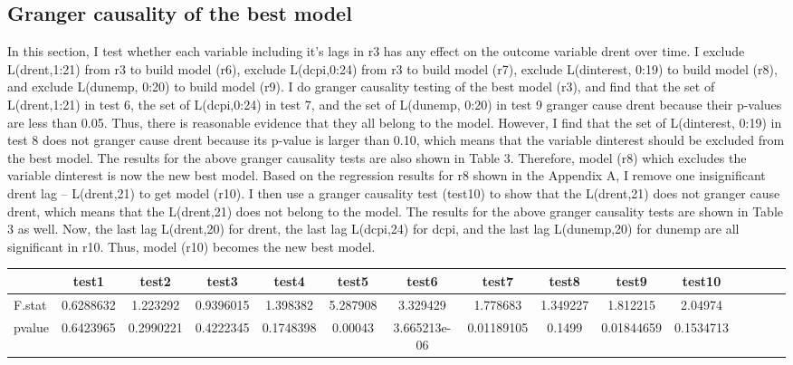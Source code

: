 \documentclass[12pt, times]{article}
\renewcommand{\baselinestretch}{1.5}
\begin{document}
\subsection{Granger causality of the best model}
In this section, I test whether each variable including it’s lags in r3 has any effect on the outcome variable drent over time. I exclude L(drent,1:21) from r3 to build model (r6), exclude L(dcpi,0:24) from r3 to build model (r7), exclude L(dinterest, 0:19) to build model (r8), and exclude L(dunemp, 0:20) to build model (r9). I do granger causality testing of the best model (r3), and find that the set of L(drent,1:21) in test 6, the set of L(dcpi,0:24) in test 7, and the set of L(dunemp, 0:20) in test 9 granger cause drent because their p-values are less than 0.05. Thus, there is reasonable evidence that they all belong to the model. However, I find that the set of L(dinterest, 0:19) in test 8 does not granger cause drent because its p-value is larger than 0.10, which means that the variable dinterest should be excluded from the best model. The results for the above granger causality tests are also shown in Table 3. Therefore, model (r8) which excludes the variable dinterest is now the new best model. Based on the regression results for r8 shown in the Appendix A, I remove one insignificant drent lag – L(drent,21) to get model (r10). I then use a granger causality test (test10) to show that the L(drent,21) does not granger cause drent, which means that the L(drent,21) does not belong to the model. The results for the above granger causality tests are shown in Table 3 as well. Now, the last lag L(drent,20) for drent, the last lag L(dcpi,24) for dcpi, and the last lag L(dunemp,20) for dunemp are all significant in r10. Thus, model (r10) becomes the new best model.

\renewcommand{\baselinestretch}{0.5}
  \begin{scriptsize}
  \begin{center}
  \tabcolsep 4pt
    \begin{tabular}{lcccccccccccccc}
    \toprule
            & test1 & test2 & test3 & test4 & test5 & test6 & test7 & test8 & test9 & test10 \\
\midrule
F.stat      & 0.6288632	& 1.223292 & 0.9396015 & 1.398382 & 5.287908 & 3.329429 &   1.778683 & 1.349227 & 1.812215 & 2.04974
\\
pvalue      & 0.6423965	& 0.2990221 & 0.4222345 & 0.1748398 & 0.00043 & 3.665213e-06 & 0.01189105 & 0.1499 & 0.01844659 & 0.1534713 \\
\bottomrule													
    \end{tabular}
    \end{center}
  \end{scriptsize}
\end{document}
